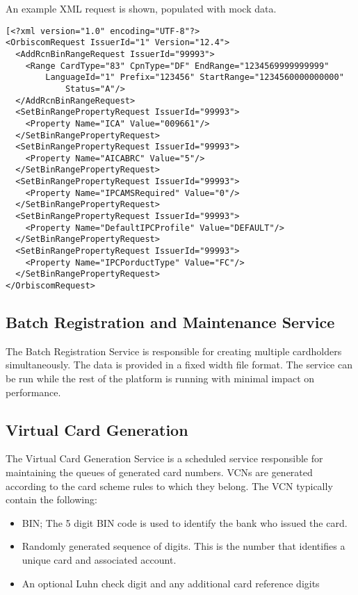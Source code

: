 \documentclass[a4paper, 11pt, titlepage]{article}
\begin{document}
An example XML request is shown, populated with mock data. 
\begin{verbatim} 
[<?xml version="1.0" encoding="UTF-8"?> 
<OrbiscomRequest IssuerId="1" Version="12.4"> 
  <AddRcnBinRangeRequest IssuerId="99993"> 
    <Range CardType="83" CpnType="DF" EndRange="1234569999999999" 
        LanguageId="1" Prefix="123456" StartRange="1234560000000000" 
            Status="A"/> 
  </AddRcnBinRangeRequest> 
  <SetBinRangePropertyRequest IssuerId="99993"> 
    <Property Name="ICA" Value="009661"/> 
  </SetBinRangePropertyRequest> 
  <SetBinRangePropertyRequest IssuerId="99993"> 
    <Property Name="AICABRC" Value="5"/> 
  </SetBinRangePropertyRequest> 
  <SetBinRangePropertyRequest IssuerId="99993"> 
    <Property Name="IPCAMSRequired" Value="0"/> 
  </SetBinRangePropertyRequest> 
  <SetBinRangePropertyRequest IssuerId="99993"> 
    <Property Name="DefaultIPCProfile" Value="DEFAULT"/> 
  </SetBinRangePropertyRequest> 
  <SetBinRangePropertyRequest IssuerId="99993"> 
    <Property Name="IPCPorductType" Value="FC"/> 
  </SetBinRangePropertyRequest> 
</OrbiscomRequest> 
\end{verbatim} 
 
 
\subsection{Batch Registration and Maintenance Service} 
The Batch Registration Service is responsible for creating multiple cardholders simultaneously. The data is provided in a fixed width file format. The service can be run while the rest of the platform is running with minimal impact on performance.
 
 
\subsection{Virtual Card Generation} 
The Virtual Card Generation Service is a scheduled service responsible for maintaining the queues of generated card numbers. VCNs are generated according to the card scheme rules to which they belong. The VCN typically contain the following:
\begin{itemize}
\item \label{bin_range} BIN; The 5 digit BIN code is used to identify the bank who issued the card.
\item Randomly generated sequence of digits. This is the number that identifies a unique card and associated account.
\item An optional Luhn check digit and any additional card reference digits
\end{itemize}
\end{document}
